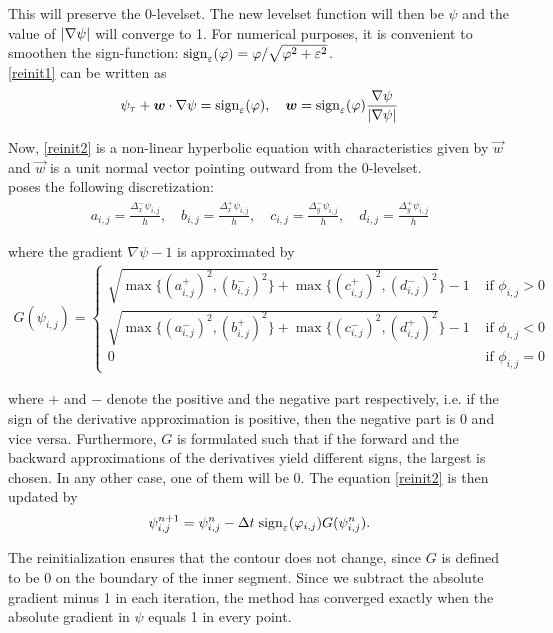This will preserve the 0-levelset. The new levelset function will then be $\psi$ and the value of $\left| {\nabla \psi} \right|$ will converge to 1.
For numerical purposes, it is convenient to smoothen the sign-function: ${\rm sign}_\varepsilon(\varphi) = \varphi/\sqrt{\varphi^2+\varepsilon^2}$.\\
\eqref{reinit1} can be written as
\begin{equation}
\psi_\tau + \vec{w}\cdot\nabla\psi = \sign_\epsilon(\phi), \quad \vec{w} = \sign_\epsilon(\phi)\frac{\nabla\psi}{\abs{\nabla\psi}}\label{reinit2}
\end{equation}

Now, \eqref{reinit2} is a non-linear hyperbolic equation with characteristics given by $\vec{w}$ and $\vec{w}$ is a unit normal vector pointing outward from the 0-levelset.\\
\cite{suss.94} poses the following discretization:
\begin{align}
a_{i,j} = \frac{\Delta_x^- \psi_{i,j}}{h},\quad b_{i,j} = \frac{\Delta_x^+ \psi_{i,j}}{h},\quad c_{i,j} = \frac{\Delta_y^- \psi_{i,j}}{h}, \quad d_{i,j} = \frac{\Delta_y^+ \psi_{i,j}}{h} 
\end{align}

where the gradient $\nabla \psi-1$ is approximated by 
\begin{align}
  G(\psi_{i,j}) = \begin{cases}
    \sqrt{\max\{(a_{i,j}^+)^2,(b_{i,j}^-)^2\}+\max\{(c_{i,j}^+)^2,(d_{i,j}^-)^2}\}-1 & \mbox{ if } \phi_{i,j}>0\\
    \sqrt{\max\{(a_{i,j}^-)^2,(b_{i,j}^+)^2\}+\max\{(c_{i,j}^-)^2,(d_{i,j}^+)^2}\}-1 & \mbox{ if } \phi_{i,j}<0\\
    0 &\mbox{ if } \phi_{i,j}=0
  \end{cases}
\end{align}

where $+$ and $-$ denote the positive and the negative part respectively, i.e. if the sign of the derivative approximation is positive, then the negative part is 0 and vice versa. Furthermore, $G$ is formulated such that if the forward and the backward approximations of the derivatives yield different signs, the largest is chosen. In any other case, one of them will be 0. The equation \eqref{reinit2} is then updated by 
\begin{equation}
\psi_{i,j}^{n+1}=\psi_{i,j}^n - \Delta t \;{\rm sign}_\varepsilon(\varphi_{i,j})G(\psi_{i,j}^n).
\end{equation}

The reinitialization ensures that the contour does not change, since $G$ is defined to be 0 on the boundary of the inner segment. Since we subtract the absolute gradient minus 1 in each iteration, the method has converged exactly when the absolute gradient in $\psi$ equals 1 in every point.